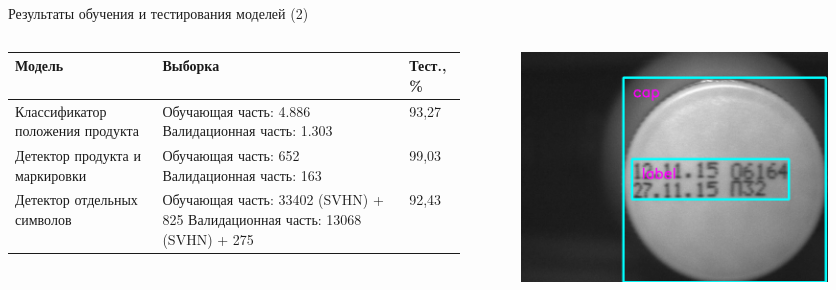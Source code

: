 \documentclass[10pt]{beamer}
\begin{document}
        \begin{frame}{Результаты обучения и тестирования моделей (2)}
            \begin{columns}
                \begin{column}{0.55\textwidth}
                    \begin{table}
                        \centering
                        \begin{tabular}{| p{2.3cm} | p{2.3cm} | p{1cm} | }
                          \hline
                            \textbf{Модель} & 
                            \textbf{Выборка} & \textbf{Тест., \%}\\
                            \hline
                            Классификатор положения продукта & Обучающая часть: 4.886\newline
                            Валидационная часть: 
                            1.303 & 93,27\\
                            \hline
                            Детектор продукта и маркировки & Обучающая часть:
                            652\newline
                            Валидационная часть:
                            163 & 99,03\\
                            \hline
                            Детектор отдельных символов & Обучающая часть:
                            33402 (SVHN) + 825\newline
                            Валидационная часть:
                            13068 (SVHN) + 275 & 92,43\\
                            \hline
                        \end{tabular}
                    \end{table}  
                \end{column}
                \begin{column}{0.45\textwidth}
                    \begin{figure}
                        \centering
                        \includegraphics[width=\textwidth]{pic4-25.png}

\end{figure}
\end{column}
\end{columns}
\end{frame}
\end{document}
